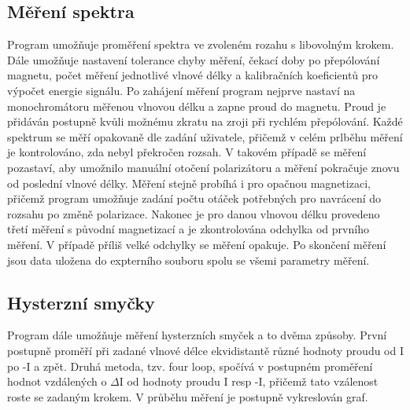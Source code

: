 \subsection{Měření spektra}
Program umožňuje proměření spektra ve zvoleném rozahu s libovolným krokem. Dále umožňuje nastavení tolerance chyby měření, čekací doby po přepólování magnetu, počet měření jednotlivé vlnové délky a kalibračních koeficientů pro výpočet energie signálu. Po zahájení měření program nejprve nastaví na monochromátoru měřenou vlnovou délku a zapne proud do magnetu. Proud je přidáván postupně kvůli možnému zkratu na zroji při rychlém přepólování. Každé spektrum se měří opakovaně dle zadání uživatele, přičemž v celém prlběhu měření je kontrolováno, zda nebyl překročen rozsah. V takovém případě se měření pozastaví, aby umožnilo manuální otočení polarizátoru a měření pokračuje znovu od poslední vlnové délky. Měření stejně probíhá i pro opačnou magnetizaci, přičemž program umožňuje zadání počtu otáček potřebných pro navrácení do rozsahu po změně polarizace. Nakonec je pro danou vlnovou délku provedeno třetí měření s původní magnetizací a je zkontrolována odchylka od prvního měření. V případě příliš velké odchylky se měření opakuje. Po skončení měření jsou data uložena do expterního souboru spolu se všemi parametry měření.

\subsection{Hysterzní smyčky}
Program dále umožňuje měření hysterzních smyček a to dvěma způsoby. První postupně proměří při zadané vlnové délce ekvidistantě různé hodnoty proudu od I po -I a zpět. Druhá metoda, tzv. four loop, spočívá v postupném proměření hodnot vzdálených o $\Delta$I od hodnoty proudu I resp -I, přičemž tato vzálenost roste se zadaným krokem. V průběhu měření je postupně vykreslován graf.
